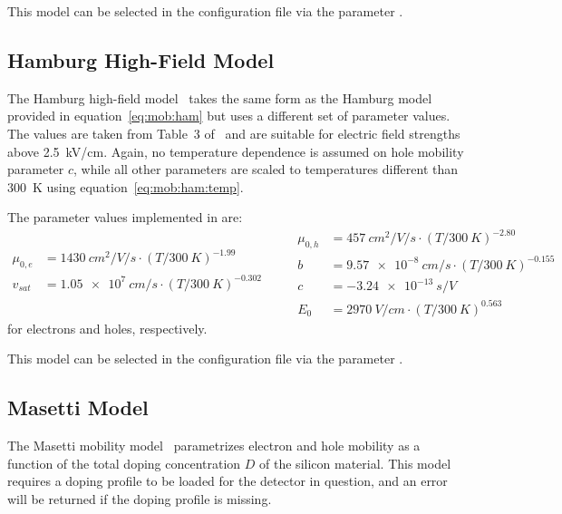 This model can be selected in the configuration file via the parameter .


\subsection{Hamburg High-Field Model}

The Hamburg high-field model~\cite{hamburg} takes the same form as the Hamburg model provided in equation~\eqref{eq:mob:ham} but uses a different set of parameter values.
The values are taken from Table~3 of~\cite{hamburg} and are suitable for electric field strengths above \SI{2.5}{\kilo V/cm}.
Again, no temperature dependence is assumed on hole mobility parameter $c$, while all other parameters are scaled to temperatures different than \SI{300}{K} using equation~\eqref{eq:mob:ham:temp}.

The parameter values implemented in \apsq are:
\begin{equation*}
    \begin{split}
        \mu_{0,e} &= \SI{1430}{cm^2 \per V \per s} \cdot (T / \SI{300}{K})^{-1.99}\\
        v_{sat}   &= \SI{1.05e7}{cm \per s} \cdot (T / \SI{300}{K})^{-0.302}\\
    \end{split}
    \qquad
    \begin{split}
      \mu_{0,h} &= \SI{457}{cm^2 \per V \per s} \cdot (T / \SI{300}{K})^{-2.80}\\
        b       &= \SI{9.57e-8}{cm \per s} \cdot (T / \SI{300}{K})^{-0.155}\\
        c       &= \SI{-3.24e-13}{s \per V}\\
        E_0     &= \SI{2970}{V \per cm} \cdot (T / \SI{300}{K})^{0.563}
    \end{split}
\end{equation*}
for electrons and holes, respectively.

This model can be selected in the configuration file via the parameter .

\subsection{Masetti Model}
\label{sec:mob:mas}

The Masetti mobility model~\cite{masetti} parametrizes electron and hole mobility as a function of the total doping concentration $D$ of the silicon material.
This model requires a doping profile to be loaded for the detector in question, and an error will be returned if the doping profile is missing.

